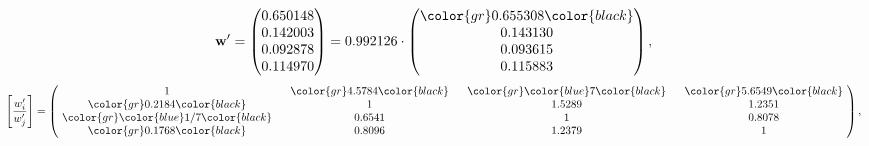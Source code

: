 \begin{example}
\begin{equation*}
\mathbf{w}^{\prime} =
\begin{pmatrix}
0.650148\\
0.142003\\
0.092878\\
0.114970
\end{pmatrix} =
0.992126\cdot
\begin{pmatrix}
\color{gr} 0.655308\color{black} \\
0.143130\\
0.093615\\
0.115883
\end{pmatrix},
\end{equation*}
\begin{equation*}
\left[ \frac{{w}^{\prime}_i}{{w}^{\prime}_j} \right] =
\begin{pmatrix}
$\,\,$ 1 $\,\,$ & $\,\,$\color{gr} 4.5784\color{black} $\,\,$ & $\,\,$\color{gr} \color{blue} 7\color{black} $\,\,$ & $\,\,$\color{gr} 5.6549\color{black} $\,\,$ \\
$\,\,$\color{gr} 0.2184\color{black} $\,\,$ & $\,\,$ 1 $\,\,$ & $\,\,$1.5289$\,\,$ & $\,\,$1.2351  $\,\,$ \\
$\,\,$\color{gr} \color{blue}  1/7\color{black} $\,\,$ & $\,\,$0.6541$\,\,$ & $\,\,$ 1 $\,\,$ & $\,\,$0.8078 $\,\,$ \\
$\,\,$\color{gr} 0.1768\color{black} $\,\,$ & $\,\,$0.8096$\,\,$ & $\,\,$1.2379$\,\,$ & $\,\,$ 1  $\,\,$ \\
\end{pmatrix},
\end{equation*}
\end{example}
\newpage
